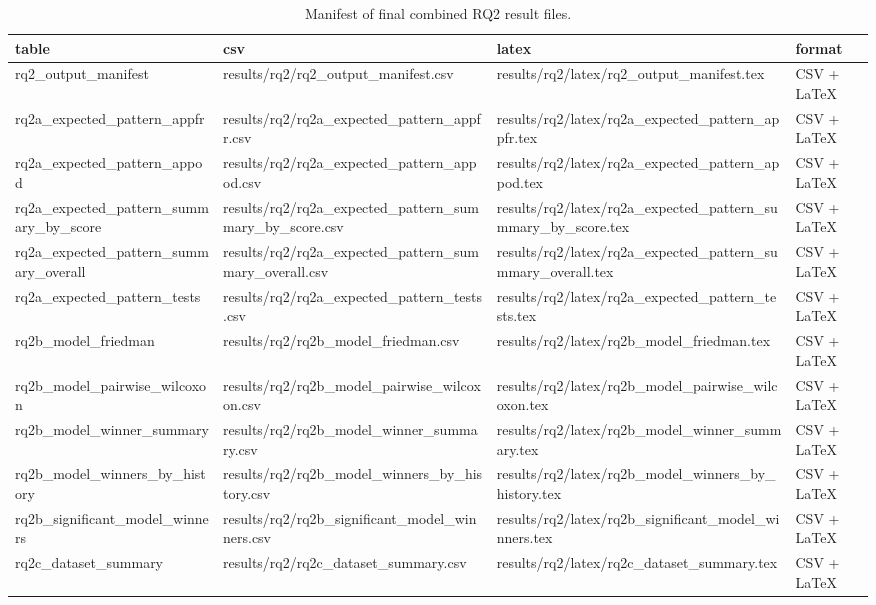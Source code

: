\begin{table}[tbp]
\caption{Manifest of final combined RQ2 result files.}
\label{tab:rq2-output-manifest}
\begin{tabular}{llll}
\toprule
table & csv & latex & format \\
\midrule
rq2\_output\_manifest & results/rq2/rq2\_output\_manifest.csv & results/rq2/latex/rq2\_output\_manifest.tex & CSV + LaTeX \\
rq2a\_expected\_pattern\_appfr & results/rq2/rq2a\_expected\_pattern\_appfr.csv & results/rq2/latex/rq2a\_expected\_pattern\_appfr.tex & CSV + LaTeX \\
rq2a\_expected\_pattern\_appod & results/rq2/rq2a\_expected\_pattern\_appod.csv & results/rq2/latex/rq2a\_expected\_pattern\_appod.tex & CSV + LaTeX \\
rq2a\_expected\_pattern\_summary\_by\_score & results/rq2/rq2a\_expected\_pattern\_summary\_by\_score.csv & results/rq2/latex/rq2a\_expected\_pattern\_summary\_by\_score.tex & CSV + LaTeX \\
rq2a\_expected\_pattern\_summary\_overall & results/rq2/rq2a\_expected\_pattern\_summary\_overall.csv & results/rq2/latex/rq2a\_expected\_pattern\_summary\_overall.tex & CSV + LaTeX \\
rq2a\_expected\_pattern\_tests & results/rq2/rq2a\_expected\_pattern\_tests.csv & results/rq2/latex/rq2a\_expected\_pattern\_tests.tex & CSV + LaTeX \\
rq2b\_model\_friedman & results/rq2/rq2b\_model\_friedman.csv & results/rq2/latex/rq2b\_model\_friedman.tex & CSV + LaTeX \\
rq2b\_model\_pairwise\_wilcoxon & results/rq2/rq2b\_model\_pairwise\_wilcoxon.csv & results/rq2/latex/rq2b\_model\_pairwise\_wilcoxon.tex & CSV + LaTeX \\
rq2b\_model\_winner\_summary & results/rq2/rq2b\_model\_winner\_summary.csv & results/rq2/latex/rq2b\_model\_winner\_summary.tex & CSV + LaTeX \\
rq2b\_model\_winners\_by\_history & results/rq2/rq2b\_model\_winners\_by\_history.csv & results/rq2/latex/rq2b\_model\_winners\_by\_history.tex & CSV + LaTeX \\
rq2b\_significant\_model\_winners & results/rq2/rq2b\_significant\_model\_winners.csv & results/rq2/latex/rq2b\_significant\_model\_winners.tex & CSV + LaTeX \\
rq2c\_dataset\_summary & results/rq2/rq2c\_dataset\_summary.csv & results/rq2/latex/rq2c\_dataset\_summary.tex & CSV + LaTeX \\

\end{tabular}
\end{table}
